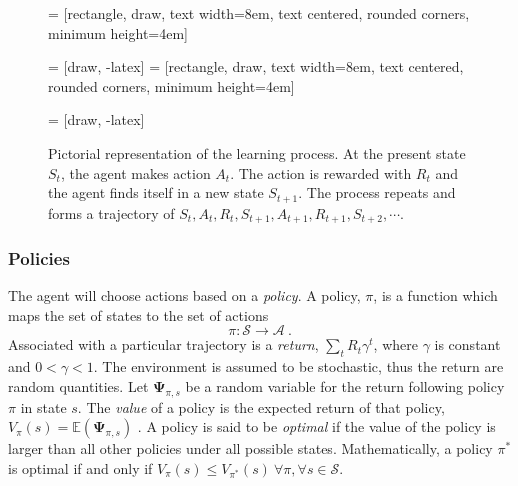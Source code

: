 \begin{figure}[h!]
\centering
	
 = [rectangle, draw, 
text width=8em, text centered, rounded corners, minimum height=4em]

 = [draw, -latex]
 = [rectangle, draw, 
text width=8em, text centered, rounded corners, minimum height=4em]

 = [draw, -latex]


\caption{Pictorial representation of the learning process.  At the present state $ S_t $, the agent makes action $ A_t $.  The action is rewarded with $ R_t $ and the agent finds itself in a new state $ S_{t+1} $.  The process repeats and forms a trajectory of $ {S_t,A_t,R_t,S_{t+1}, A_{t+1}, R_{t+1}, S_{t+2}, \cdots} $.  }
\label{RL_diagram}
\end{figure}


\subsubsection{Policies}

The agent will choose actions based on a \textit{policy}.  A policy, $ \pi $, is a function which maps the set of states to the set of actions  
%
\begin{equation}\label{key}
\pi : \mathcal{S} \rightarrow \mathcal{A}\>.
\end{equation}
%
Associated with a particular trajectory is a \textit{return}, $ \sum_t R_t \gamma^t $, where $ \gamma $ is constant and $ 0 < \gamma < 1 $.  The environment is assumed to be stochastic, thus the return are random quantities. Let $ \mathbf{\Psi}_{\pi,s} $ be a random variable for the return following policy $ \pi $ in state $ s $.  The \textit{value} of a policy is the expected return of that policy, $V_{\pi}(s) =  \mathbb{E}(\mathbf{\Psi}_{\pi,s}) $ \cite{lizotte2017reinforcement}.  A policy is said to be \textit{optimal} if the value of the policy is larger than all other policies under all possible states.  Mathematically, a policy $ \pi^* $ is optimal if and only if $ V_{\pi}(s)  \leq V_{\pi^*}(s) \> \forall \pi, \forall s\in \mathcal{S}  $.



